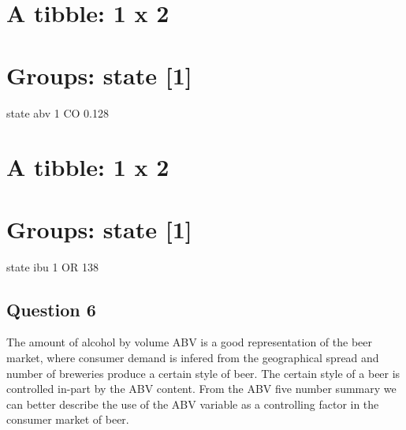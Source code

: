 \documentclass[]{article}
\newenvironment{Shaded}{\begin{snugshade}}{\end{snugshade}}
\newcommand{\KeywordTok}[1]{\textcolor[rgb]{0.13,0.29,0.53}{\textbf{#1}}}
\newcommand{\DecValTok}[1]{\textcolor[rgb]{0.00,0.00,0.81}{#1}}
\newcommand{\StringTok}[1]{\textcolor[rgb]{0.31,0.60,0.02}{#1}}
\newcommand{\CommentTok}[1]{\textcolor[rgb]{0.56,0.35,0.01}{\textit{#1}}}
\newcommand{\OperatorTok}[1]{\textcolor[rgb]{0.81,0.36,0.00}{\textbf{#1}}}
\newcommand{\NormalTok}[1]{#1}
\begin{document}
\section{A tibble: 1 x 2}\label{a-tibble-1-x-2}

\section{Groups: state {[}1{]}}\label{groups-state-1}

state abv 1 CO 0.128

\begin{Shaded}
\end{Shaded}

\section{A tibble: 1 x 2}\label{a-tibble-1-x-2-1}

\section{Groups: state {[}1{]}}\label{groups-state-1-1}

state ibu 1 OR 138

\subsection{Question 6}\label{question-6}

The amount of alcohol by volume ABV is a good representation of the beer
market, where consumer demand is infered from the geographical spread
and number of breweries produce a certain style of beer. The certain
style of a beer is controlled in-part by the ABV content. From the ABV
five number summary we can better describe the use of the ABV variable
as a controlling factor in the consumer market of beer.
\end{document}
